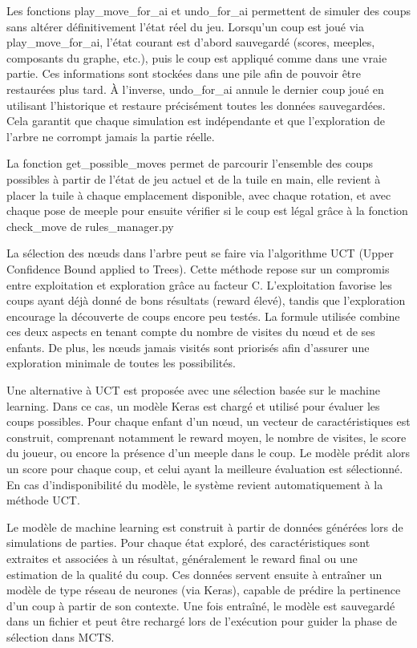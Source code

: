 \documentclass[11pt]{article}
\begin{document}
Les fonctions play\_move\_for\_ai et undo\_for\_ai permettent de simuler des coups sans altérer définitivement l’état réel du jeu. Lorsqu’un coup est joué via play\_move\_for\_ai, l’état courant est d’abord sauvegardé (scores, meeples, composants du graphe, etc.), puis le coup est appliqué comme dans une vraie partie. Ces informations sont stockées dans une pile afin de pouvoir être restaurées plus tard. À l’inverse, undo\_for\_ai annule le dernier coup joué en utilisant l’historique et restaure précisément toutes les données sauvegardées. Cela garantit que chaque simulation est indépendante et que l’exploration de l’arbre ne corrompt jamais la partie réelle.

La fonction get\_possible\_moves permet de parcourir l’ensemble des coups possibles à partir de l’état de jeu actuel et de la tuile en main, elle revient à placer la tuile à chaque emplacement disponible, avec chaque rotation, et avec chaque pose de meeple pour ensuite vérifier si le coup est légal grâce à la fonction check\_move de rules\_manager.py

La sélection des nœuds dans l’arbre peut se faire via l’algorithme UCT (Upper Confidence Bound applied to Trees). Cette méthode repose sur un compromis entre exploitation et exploration grâce au facteur C. L’exploitation favorise les coups ayant déjà donné de bons résultats (reward élevé), tandis que l’exploration encourage la découverte de coups encore peu testés. La formule utilisée combine ces deux aspects en tenant compte du nombre de visites du nœud et de ses enfants. De plus, les nœuds jamais visités sont priorisés afin d’assurer une exploration minimale de toutes les possibilités.

Une alternative à UCT est proposée avec une sélection basée sur le machine learning. Dans ce cas, un modèle Keras est chargé et utilisé pour évaluer les coups possibles. Pour chaque enfant d’un nœud, un vecteur de caractéristiques est construit, comprenant notamment le reward moyen, le nombre de visites, le score du joueur, ou encore la présence d’un meeple dans le coup. Le modèle prédit alors un score pour chaque coup, et celui ayant la meilleure évaluation est sélectionné. En cas d’indisponibilité du modèle, le système revient automatiquement à la méthode UCT.

Le modèle de machine learning est construit à partir de données générées lors de simulations de parties. Pour chaque état exploré, des caractéristiques sont extraites et associées à un résultat, généralement le reward final ou une estimation de la qualité du coup. Ces données servent ensuite à entraîner un modèle de type réseau de neurones (via Keras), capable de prédire la pertinence d’un coup à partir de son contexte. Une fois entraîné, le modèle est sauvegardé dans un fichier et peut être rechargé lors de l’exécution pour guider la phase de sélection dans MCTS.
\end{document}
